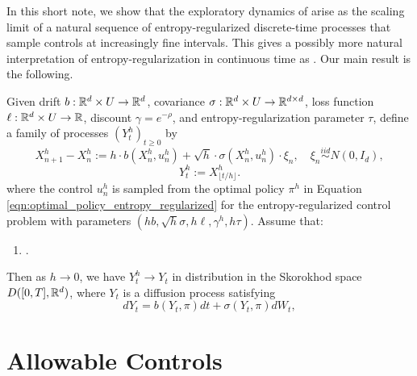  In this short note, we show that the exploratory dynamics of \cite{wang2020_reinforcement_learning_stochastic_control} arise as the scaling limit of
a natural sequence of entropy-regularized discrete-time processes that sample controls at increasingly fine intervals. This gives a possibly more natural interpretation of
entropy-regularization in continuous time as . Our main result is the following.

\begin{theorem}

	\label{thm:entropy_regularized_diffusive_limits}

	Given drift $b : \mathbb{R}^d \times U \to \mathbb{R}^d$, covariance $\sigma:\mathbb{R}^d\times U \to \mathbb{R}^{d \times d}$, loss function $\ell : \mathbb{R}^d \times U \to \mathbb{R}$,
	discount $\gamma = e^{-\rho}$, and entropy-regularization parameter $\tau$, define a family of processes $(Y^h_t)_{t \geq 0}$ by
	\[X^h_{n+1} - X^h_{n} := h \cdot b(X^h_{n}, u^h_n) + \sqrt{h} \cdot \sigma(X^h_{n} , u^h_n) \cdot \xi_n,  \quad \xi_n \overset{iid}{\sim} N(0, I_d),\]
	\[Y^h_t := X^h_{\lfloor t/h \rfloor}.\]
	\noindent where the control $u^h_n$ is sampled from the optimal policy $\pi^h$ in Equation \eqref{eqn:optimal_policy_entropy_regularized} for the entropy-regularized
	control problem with parameters $(hb, \sqrt{h} \sigma,  h \ell, \gamma^h,  h\tau)$. Assume that:

	\begin{enumerate}
		\item [(i)] .
	\end{enumerate}

	\noindent Then as $h \to 0$, we have $Y^h_t \to Y_t$ in distribution in the Skorokhod space $D([0,T], \mathbb{R}^d)$,
	 where $Y_t$ is  a diffusion process satisfying
		\begin{equation}
			dY_t = b(Y_t, \pi) dt + \sigma(Y_t, \pi) dW_t,
			\label{eqn:limiting_entropy_diffusion}
		\end{equation}
	\end{theorem}


\section{Allowable Controls}

